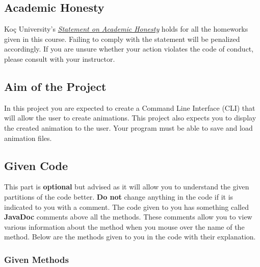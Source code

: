\documentclass[a4paper]{article}
\begin{document}
	\subsection{Academic Honesty}
	Koç University's \emph{\href{https://vpaa.ku.edu.tr/sites/vpaa.ku.edu.tr/files/Misc_Documents/Statement_on_Academic_Honesty.pdf}{Statement on Academic Honesty}} holds for all the homeworks given in this course. Failing to comply with the statement will be penalized accordingly. If you are unsure whether your action violates the code of conduct, please consult with your instructor.
	
	\subsection{Aim of the Project}
	In this project you are expected to create a Command Line Interface (CLI) that will allow the user to create animations. This project also expects you to display the created animation to the user. Your program must be able to save and load animation files.
	
	\subsection{Given Code}
	This part is \textbf{optional} but advised as it will allow you to understand the given partitions of the code better. \textbf{Do not} change anything in the code if it is indicated to you with a comment. The code given to you has something called \textbf{JavaDoc} comments above all the methods. These comments allow you to view various information about the method when you mouse over the name of the method. Below are the methods given to you in the code with their explanation.
	
	\subsubsection{Given Methods}
	
\end{document}
